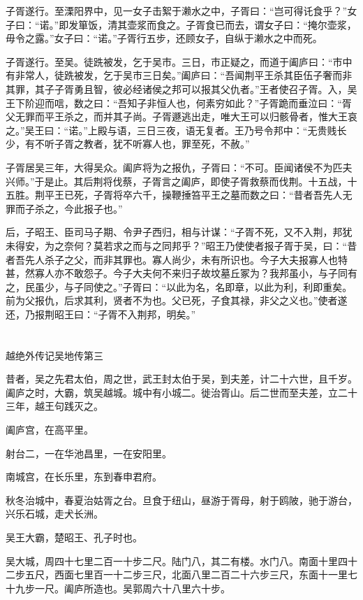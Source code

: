 \documentclass[12pt,UTF8]{ctexbook}
\begin{document}
子胥遂行。至溧阳界中，见一女子击絮于濑水之中，子胥曰：“岂可得讬食乎？”女子曰：“诺。”即发箪饭，清其壶浆而食之。子胥食已而去，谓女子曰：“掩尔壶浆，毋令之露。”女子曰：“诺。”子胥行五步，还顾女子，自纵于濑水之中而死。

子胥遂行。至吴。徒跣被发，乞于吴市。三日，市正疑之，而道于阖庐曰：“市中有非常人，徒跣被发，乞于吴市三日矣。”阖庐曰：“吾闻荆平王杀其臣伍子奢而非其罪，其子子胥勇且智，彼必经诸侯之邦可以报其父仇者。”王者使召子胥。入，吴王下阶迎而唁，数之曰：“吾知子非恒人也，何素穷如此？”子胥跪而垂泣曰：“胥父无罪而平王杀之，而并其子尚。子胥遯逃出走，唯大王可以归骸骨者，惟大王哀之。”吴王曰：“诺。”上殿与语，三日三夜，语无复者。王乃号令邦中：“无贵贱长少，有不听子胥之教者，犹不听寡人也，罪至死，不赦。”

子胥居吴三年，大得吴众。阖庐将为之报仇，子胥曰：“不可。臣闻诸侯不为匹夫兴师。”于是止。其后荆将伐蔡，子胥言之阖庐，即使子胥救蔡而伐荆。十五战，十五胜。荆平王已死，子胥将卒六千，操鞭捶笞平王之墓而数之曰：“昔者吾先人无罪而子杀之，今此报子也。”

后，子昭王、臣司马子期、令尹子西归，相与计谋：“子胥不死，又不入荆，邦犹未得安，为之奈何？莫若求之而与之同邦乎？”昭王乃使使者报子胥于吴，曰：“昔者吾先人杀子之父，而非其罪也。寡人尚少，未有所识也。今子大夫报寡人也特甚，然寡人亦不敢怨子。今子大夫何不来归子故坟墓丘冢为？我邦虽小，与子同有之，民虽少，与子同使之。”子胥曰：“以此为名，名即章，以此为利，利即重矣。前为父报仇，后求其利，贤者不为也。父已死，子食其禄，非父之义也。”使者遂还，乃报荆昭王曰：“子胥不入荆邦，明矣。”

\part{}

越绝外传记吴地传第三

昔者，吴之先君太伯，周之世，武王封太伯于吴，到夫差，计二十六世，且千岁。阖庐之时，大霸，筑吴越城。城中有小城二。徙治胥山。后二世而至夫差，立二十三年，越王句践灭之。

阖庐宫，在高平里。

射台二，一在华池昌里，一在安阳里。

南城宫，在长乐里，东到春申君府。

秋冬治城中，春夏治姑胥之台。旦食于纽山，昼游于胥母，射于鸥陂，驰于游台，兴乐石城，走犬长洲。

吴王大霸，楚昭王、孔子时也。

吴大城，周四十七里二百一十步二尺。陆门八，其二有楼。水门八。南面十里四十二步五尺，西面七里百一十二步三尺，北面八里二百二十六步三尺，东面十一里七十九步一尺。阖庐所造也。吴郭周六十八里六十步。
\end{document}
